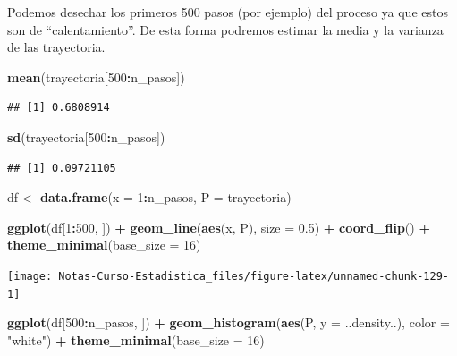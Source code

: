 \documentclass[
  12pt,
]{book}
\newenvironment{Shaded}{\begin{snugshade}}{\end{snugshade}}
\newcommand{\DataTypeTok}[1]{\textcolor[rgb]{0.13,0.29,0.53}{#1}}
\newcommand{\DecValTok}[1]{\textcolor[rgb]{0.00,0.00,0.81}{#1}}
\newcommand{\FloatTok}[1]{\textcolor[rgb]{0.00,0.00,0.81}{#1}}
\newcommand{\KeywordTok}[1]{\textcolor[rgb]{0.13,0.29,0.53}{\textbf{#1}}}
\newcommand{\NormalTok}[1]{#1}
\newcommand{\OperatorTok}[1]{\textcolor[rgb]{0.81,0.36,0.00}{\textbf{#1}}}
\newcommand{\StringTok}[1]{\textcolor[rgb]{0.31,0.60,0.02}{#1}}
\theoremstyle{definition}
\theoremstyle{definition}
\theoremstyle{definition}
\theoremstyle{remark}
\begin{document}
Podemos desechar los primeros 500 pasos (por ejemplo) del proceso ya que estos son de \enquote{calentamiento}. De esta forma podremos estimar la media y la varianza de las trayectoria.

\begin{Shaded}
\begin{Highlighting}[]
\KeywordTok{mean}\NormalTok{(trayectoria[}\DecValTok{500}\OperatorTok{:}\NormalTok{n_pasos])}
\end{Highlighting}
\end{Shaded}

\begin{verbatim}
## [1] 0.6808914
\end{verbatim}

\begin{Shaded}
\begin{Highlighting}[]
\KeywordTok{sd}\NormalTok{(trayectoria[}\DecValTok{500}\OperatorTok{:}\NormalTok{n_pasos])}
\end{Highlighting}
\end{Shaded}

\begin{verbatim}
## [1] 0.09721105
\end{verbatim}

\begin{Shaded}
\begin{Highlighting}[]
\NormalTok{df <-}\StringTok{ }\KeywordTok{data.frame}\NormalTok{(}\DataTypeTok{x =} \DecValTok{1}\OperatorTok{:}\NormalTok{n_pasos, }\DataTypeTok{P =}\NormalTok{ trayectoria)}

\KeywordTok{ggplot}\NormalTok{(df[}\DecValTok{1}\OperatorTok{:}\DecValTok{500}\NormalTok{, ]) }\OperatorTok{+}\StringTok{ }\KeywordTok{geom_line}\NormalTok{(}\KeywordTok{aes}\NormalTok{(x, P), }\DataTypeTok{size =} \FloatTok{0.5}\NormalTok{) }\OperatorTok{+}\StringTok{ }
\StringTok{    }\KeywordTok{coord_flip}\NormalTok{() }\OperatorTok{+}\StringTok{ }\KeywordTok{theme_minimal}\NormalTok{(}\DataTypeTok{base_size =} \DecValTok{16}\NormalTok{)}
\end{Highlighting}
\end{Shaded}

\begin{center}\texttt{[image: Notas-Curso-Estadistica\_files/figure-latex/unnamed-chunk-129-1]} \end{center}

\begin{Shaded}
\begin{Highlighting}[]
\KeywordTok{ggplot}\NormalTok{(df[}\DecValTok{500}\OperatorTok{:}\NormalTok{n_pasos, ]) }\OperatorTok{+}\StringTok{ }\KeywordTok{geom_histogram}\NormalTok{(}\KeywordTok{aes}\NormalTok{(P, }\DataTypeTok{y =}\NormalTok{ ..density..), }
    \DataTypeTok{color =} \StringTok{"white"}\NormalTok{) }\OperatorTok{+}\StringTok{ }\KeywordTok{theme_minimal}\NormalTok{(}\DataTypeTok{base_size =} \DecValTok{16}\NormalTok{)}
\end{Highlighting}
\end{Shaded}
\end{document}
